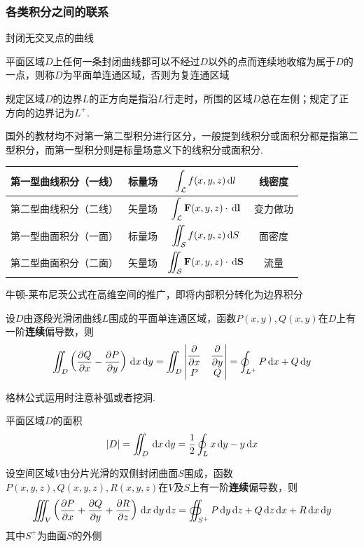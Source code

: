 \subsubsection{各类积分之间的联系}
\begin{definition}[简单闭曲线]
封闭无交叉点的曲线
\end{definition}
\begin{definition}[连通区域]
平面区域$D$上任何一条封闭曲线都可以不经过$D$以外的点而连续地收缩为属于$D$的一点，则称$D$为平面单连通区域，否则为复连通区域
\end{definition}
\par 规定区域$D$的边界$L$的正方向是指沿$L$行走时，所围的区域$D$总在左侧；规定了正方向的边界记为$L^+$.
\par 国外的教材均不对第一第二型积分进行区分，一般提到线积分或面积分都是指第二型积分，而第一型积分则是标量场意义下的线积分或面积分.
\begin{center}
\begin{tabular}{|c|c|c|c|}\hline
第一型曲线积分（一线） & 标量场 & $\displaystyle\int_{\mathcal{L}} f(x,y,z)\,\mathrm{d} l$ & 线密度\\\hline
第二型曲线积分（二线） & 矢量场 & $\displaystyle\int_{\mathcal{L}}\mathbf{F}(x,y,z)\cdot\,\mathrm{d}\mathbf{l}$ & 变力做功\\\hline
第一型曲面积分（一面） & 标量场 & $\displaystyle\iint_{\mathcal{S}} f(x,y,z)\,\mathrm{d} S$ & 面密度\\\hline
第二型曲面积分（二面） & 矢量场 & $\displaystyle\iint_{\mathcal{S}}\mathbf{F}(x,y,z)\cdot\,\mathrm{d}\mathbf{S}$ & 流量\\\hline
\end{tabular}
\end{center}
\par 牛顿-莱布尼茨公式在高维空间的推广，即将内部积分转化为边界积分
\begin{theorem}[格林(Green)公式]
设$D$由逐段光滑闭曲线$L$围成的平面单连通区域，函数$P(x,y),Q(x,y)$在$D$上有一阶\textbf{连续}偏导数，则
\[\iint_D\left(\dfrac{\partial Q}{\partial x}-\dfrac{\partial P}{\partial y}\right)\,\mathrm{d} x\,\mathrm{d} y=\iint_D\begin{vmatrix}\dfrac{\partial }{\partial x}&\dfrac{\partial }{\partial y}\\P&Q\end{vmatrix}=\oint_{L^+}P\,\mathrm{d} x+Q\,\mathrm{d} y\]
\end{theorem}
格林公式运用时注意补弧或者挖洞.
\par 平面区域$D$的面积
\[|D|=\iint_D\,\mathrm{d} x\,\mathrm{d} y=\frac{1}{2}\oint_Lx\,\mathrm{d} y-y\,\mathrm{d} x\]
\begin{theorem}[高斯(Gauss)公式]
设空间区域$V$由分片光滑的双侧封闭曲面$S$围成，函数$P(x,y,z),Q(x,y,z),R(x,y,z)$在$V$及$S$上有一阶\textbf{连续}偏导数，则
\[\iiint_V\left(\dfrac{\partial P}{\partial x}+\dfrac{\partial Q}{\partial y}+\dfrac{\partial R}{\partial z}\right)\,\mathrm{d} x\,\mathrm{d} y\,\mathrm{d} z=\oiint_{S^+}P\,\mathrm{d} y\,\mathrm{d} z+Q\,\mathrm{d} z\,\mathrm{d} x+R\,\mathrm{d} x\,\mathrm{d} y\]
其中$S^+$为曲面$S$的外侧
\end{theorem}
